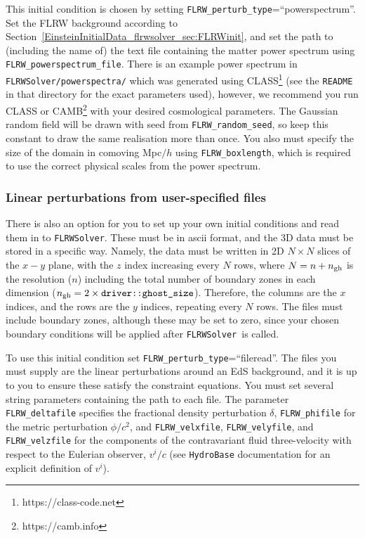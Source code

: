 This initial condition is chosen by setting \texttt{FLRW\_perturb\_type}=``powerspectrum''. Set the FLRW background according to Section~\ref{EinsteinInitialData_flrwsolver_sec:FLRWinit}, and set the path to (including the name of) the text file containing the matter power spectrum using \texttt{FLRW\_powerspectrum\_file}. There is an example power spectrum in \texttt{FLRWSolver/powerspectra/} which was generated using CLASS\footnote{https://class-code.net} (see the \texttt{README} in that directory for the exact parameters used), however, we recommend you run CLASS or CAMB\footnote{https://camb.info} with your desired cosmological parameters.
The Gaussian random field will be drawn with seed from \texttt{FLRW\_random\_seed}, so keep this constant to draw the same realisation more than once. You also must specify the size of the domain in comoving Mpc$/h$ using \texttt{FLRW\_boxlength}, which is required to use the correct physical scales from the power spectrum. 




\subsubsection{Linear perturbations from user-specified files}

There is also an option for you to set up your own initial conditions and read them in to \texttt{FLRWSolver}. These must be in ascii format, and the 3D data must be stored in a specific way.
Namely, the data must be written in 2D $N\times N$ slices of the $x-y$ plane, with the $z$ index increasing every $N$ rows, where $N=n+n_{\rm gh}$ is the resolution ($n$) including the total number of boundary zones in each dimension ($n_{\rm gh}=2\times\texttt{driver::ghost\_size}$). Therefore, the columns are the $x$ indices, and the rows are the $y$ indices, repeating every $N$ rows. The files must include boundary zones, although these may be set to zero, since your chosen boundary conditions will be applied after \texttt{FLRWSolver}\ is called.

To use this initial condition set \texttt{FLRW\_perturb\_type}=``fileread''. The files you must supply are the linear perturbations around an EdS background, and it is up to you to ensure these satisfy the constraint equations. You must set several string parameters containing the path to each file. 
The parameter \texttt{FLRW\_deltafile} specifies the fractional density perturbation $\delta$, \texttt{FLRW\_phifile} for the metric perturbation $\phi/c^2$, and \texttt{FLRW\_velxfile}, \texttt{FLRW\_velyfile}, and \texttt{FLRW\_velzfile} for the components of the contravariant fluid three-velocity with respect to the Eulerian observer, $v^i/c$ (see \texttt{HydroBase} documentation for an explicit definition of $v^i$). 



